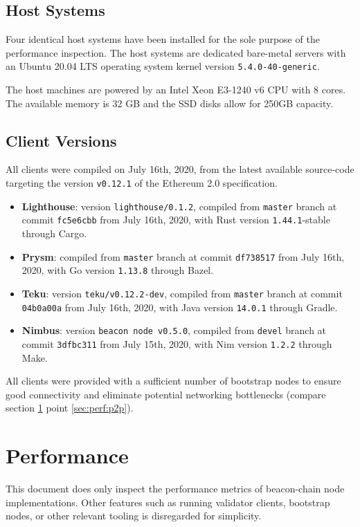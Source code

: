 \documentclass[twoside,twocolumn]{article}
\begin{document}
\subsection{Host Systems}
Four identical host systems have been installed for the sole purpose of the performance inspection. The host systems are dedicated bare-metal servers with an Ubuntu 20.04 LTS operating system kernel version \texttt{5.4.0-40-generic}.\par

The host machines are powered by an Intel Xeon E3-1240 v6 CPU with 8 cores. The available memory is 32 GB and the SSD disks allow for 250GB capacity.\par

\subsection{Client Versions}
All clients were compiled on July 16th, 2020, from the latest available source-code targeting the version \texttt{v0.12.1} of the Ethereum 2.0 specification.

\begin{itemize}
\item \textbf{Lighthouse}: version \texttt{lighthouse/0.1.2}, compiled from \texttt{master} branch at commit \texttt{fc5e6cbb} from July 16th, 2020, with Rust version \texttt{1.44.1}-stable through Cargo.
\item \textbf{Prysm}: compiled from \texttt{master} branch at commit \texttt{df738517} from July 16th, 2020, with Go version \texttt{1.13.8} through Bazel.
\item \textbf{Teku}: version \texttt{teku/v0.12.2-dev}, compiled from \texttt{master} branch at commit \texttt{04b0a00a} from July 16th, 2020, with Java version \texttt{14.0.1} through Gradle.
\item \textbf{Nimbus}: version \texttt{beacon node v0.5.0}, compiled from \texttt{devel} branch at commit \texttt{3dfbc311} from July 15th, 2020, with Nim version \texttt{1.2.2} through Make.
\end{itemize}

All clients were provided with a sufficient number of bootstrap nodes to ensure good connectivity and eliminate potential networking bottlenecks (compare section \ref{sec:perf} point \ref{sec:perf:p2p}).\par

\section{Performance}
\label{sec:perf}
This document does only inspect the performance metrics of beacon-chain node implementations. Other features such as running validator clients, bootstrap nodes, or other relevant tooling is disregarded for simplicity.
\end{document}
